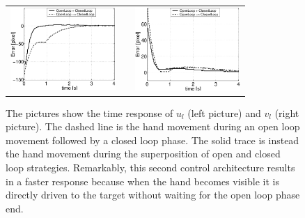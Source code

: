   \begin{figure}
  \begin{center}
	\begin{tabular}{ccc}
	  \parbox{50mm}{\includegraphics[width=40mm]{Figure/OpenVSClosedLoopTimeResponse1.eps}}  & \hspace{2cm} &
	  \parbox{50mm}{\includegraphics[width=40mm]{Figure/OpenVSClosedLoopTimeResponse2.eps}}
  \end{tabular}
\end{center}
\caption{The pictures show the time response of $u_l$ (left picture) and $v_l$ (right picture). The dashed line is the hand movement
during an open loop movement followed by a closed loop phase. The solid trace is instead the hand movement during 
the superposition of open and closed loop strategies. Remarkably, this second control architecture results in a faster response because when the hand becomes visible it is directly driven to the target without waiting for the open loop phase end.}\label{Fig:TimeResponseOpenVSClosedLoop}
  \end{figure}
  
  
    
